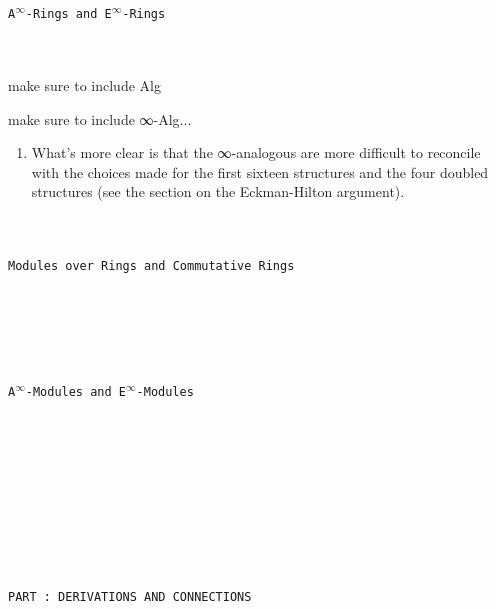 \documentclass{book}
\theoremstyle{definition}
\newcounter{pcounter}
\renewcommand{\chapter}[1]{
\newpage
{
\Huge 
\begin{center}
\ \\
\ \\
\thispagestyle{empty}
\texttt{#1}
\end{center}}
\ \\
\ \\
}
\newcounter{partcount}
\renewcommand{\part}[1]{
\newpage
{
\Huge 
\begin{center}
\ \\
\ \\
\ \\
\ \\
\ \\
\ \\
\thispagestyle{empty}
\texttt{PART {\thepartcount}: #1}
\stepcounter{partcount}
\end{center}}
\ \\
\ \\
}
\begin{document}
\newpage
\chapter{A${}^{\infty}$-Rings and E${}^{\infty}$-Rings}

make sure to include Alg

make sure to include ∞-Alg...

\begin{enumerate}
\item What's more clear is that the ∞-analogous are more difficult to reconcile with the choices made for the first sixteen structures and the four doubled structures (see the section on the Eckman-Hilton argument).
\end{enumerate}

\newpage
\chapter{Modules over Rings and Commutative Rings}




\newpage
\chapter{A${}^{\infty}$-Modules and E${}^{\infty}$-Modules}





\part{DERIVATIONS AND CONNECTIONS}
\end{document}
